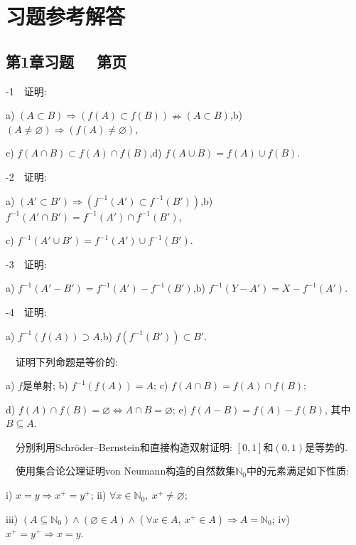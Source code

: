 \chapter{习题参考解答}

\section*{第1章习题 ~~\small 第\pageref{sec:ex1.1}页}

-1~~证明: 
\begin{center}
	a) $(A \subset B) \Rightarrow (f(A) \subset f(B)) \nRightarrow (A \subset B)$,\qquad b) $(A \neq \varnothing) \Rightarrow (f(A) \neq \varnothing)$,
	
	c) $f(A \cap B) \subset f(A) \cap f(B)$,\qquad d) $f(A \cup B) = f(A) \cup f(B)$.
\end{center}

-2~~证明: 
\begin{center}
	a) $(A' \subset B') \Rightarrow (f^{-1}(A') \subset f^{-1}(B'))$,\qquad b) $f^{-1}(A' \cap B') = f^{-1}(A') \cap f^{-1}(B')$,
	
	c) $f^{-1}(A' \cup B') = f^{-1}(A') \cup f^{-1}(B')$.
\end{center}
	
-3~~证明: 
\begin{center}
	a) $f^{-1}(A'-B') = f^{-1}(A') - f^{-1}(B')$,\qquad b) $f^{-1}(Y-A') = X-f^{-1}(A')$.
\end{center} 

-4~~证明: 
\begin{center}
	a) $f^{-1}(f(A)) \supset A$,\qquad b) $f(f^{-1}(B')) \subset B'$.
\end{center} 
\vspace{1em}

~~证明下列命题是等价的: 

\begin{center}
	a) $f$是单射; \qquad b) $f^{-1}(f(A))=A$; \qquad c) $f(A \cap B) = f(A) \cap f(B)$;
	
	d) $f(A) \cap f(B) = \varnothing \Leftrightarrow A \cap B = \varnothing$; \qquad e) $f(A-B) = f(A) - f(B)$, 其中$B \subseteq A$. 
\end{center}
\vspace{1em}

~~分别利用Schröder–Bernstein和直接构造双射证明: $[0,1]$和$(0,1)$是等势的. 
\vspace{1em}


~~使用集合论公理证明von Neumann构造的自然数集$\mathbb{N}_0$中的元素满足如下性质: 
	\begin{center}
		i) $x=y \Rightarrow x^+ = y^+$; \qquad ii) $\forall x \in \mathbb{N}_0,~x^+ \neq \varnothing$;
	
		iii) $(A \subseteq \mathbb{N}_0) \wedge (\varnothing \in A) \wedge (\forall x \in A,~x^+ \in A) \Rightarrow A=\mathbb{N}_0$; \qquad iv) $x^+=y^+ \Rightarrow x=y$.
	\end{center}






